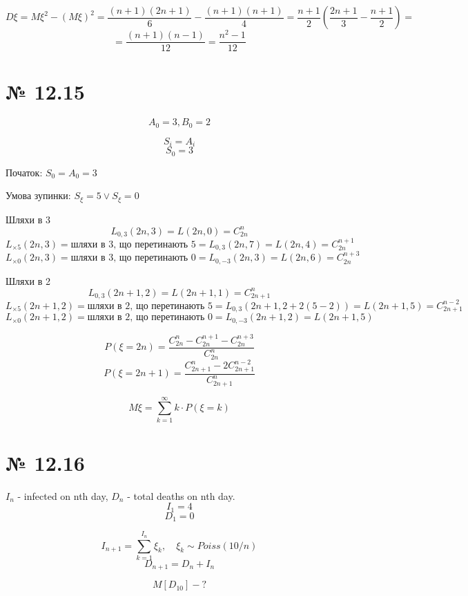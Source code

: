 \documentclass[11pt, a4paper]{article} %
\begin{document}
$$D\xi = M\xi^2 - (M\xi)^2 = \frac{(n+1)(2n+1)}{6} - \frac{(n+1)(n+1)}{4} = \frac{n+1}{2} (\frac{2n+1}{3} - \frac{n+1}{2}) =$$
$$= \frac{(n+1)(n-1)}{12} = \frac{n^2-1}{12}$$

\section*{№ 12.15}
\begin{mdframed}
    $$A_0 = 3, B_0 = 2$$
\end{mdframed}

$$S_i = A_i$$
$$S_0 = 3$$

Початок: $S_0 = A_0 = 3$

Умова зупинки: $S_\xi = 5 \vee S_\xi = 0$





Шляхи в 3
$$L_{0,3}(2n,3) = L(2n,0) = C_{2n}^n$$
$$L_{\times 5}(2n,3) = \text{шляхи в 3, що перетинають 5} = L_{0,3}(2n,7) = L(2n,4) = C_{2n}^{n+1}$$
$$L_{\times 0}(2n,3) = \text{шляхи в 3, що перетинають 0} = L_{0,-3}(2n,3) = L(2n,6) = C_{2n}^{n+3}$$

Шляхи в 2
$$L_{0,3}(2n+1,2) = L(2n+1,1) = C_{2n+1}^{n}$$
$$L_{\times 5}(2n+1,2) = \text{шляхи в 2, що перетинають 5} = L_{0,3}(2n+1,2+2(5-2)) = L(2n+1,5) = C_{2n+1}^{n-2}$$
$$L_{\times 0}(2n+1,2) = \text{шляхи в 2, що перетинають 0} = L_{0,-3}(2n+1,2) = L(2n+1,5)$$

$$P(\xi = 2n) = \frac{C_{2n}^n - C_{2n}^{n+1} - C_{2n}^{n+3}}{C_{2n}^n}$$
$$P(\xi = 2n+1) = \frac{C_{2n+1}^{n} - 2C_{2n+1}^{n-2}}{C_{2n+1}^{n}}$$

$$M\xi = \sum_{k=1}^\infty k\cdot P(\xi=k)$$


\section*{№ 12.16}
\begin{mdframed}
    $I_n$ - infected on nth day, $D_n$ - total deaths on nth day. 
    $$I_1 = 4$$
    $$D_1 = 0$$
    
    $$I_{n+1} = \sum_{k=1}^{I_n}\xi_k,\quad \xi_k \sim Poiss(10/n)$$
    $$D_{n+1} = D_n + I_n$$
    
    $$M[D_10] - ?$$
\end{mdframed}
\end{document}
